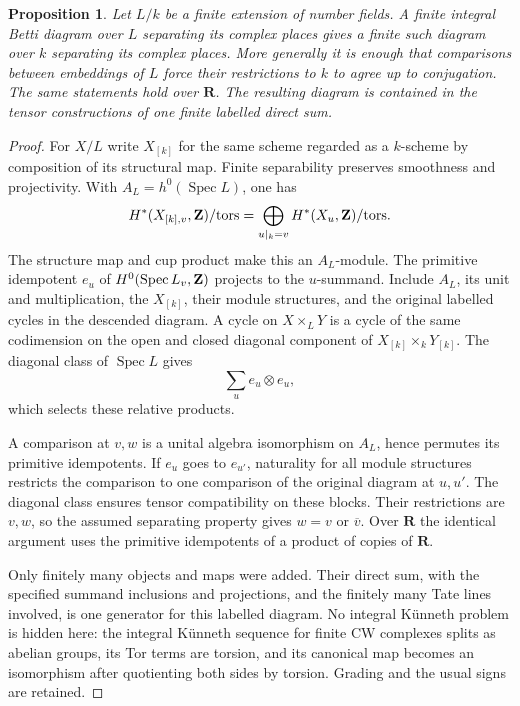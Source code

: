 \documentclass[11pt]{article}
\newtheorem{proposition}[theorem]{Proposition}
\theoremstyle{definition}\newtheorem{definition}[theorem]{Definition}
\theoremstyle{remark}\newtheorem{remark}[theorem]{Remark}
\newcommand{\R}{\mathbf R}\newcommand{\C}{\mathbf C}
\begin{document}
\begin{proposition}\label{prop:finite-test-descent}
Let $L/k$ be a finite extension of number fields. A finite integral Betti
diagram over $L$ separating its complex places gives a finite such diagram
over $k$ separating its complex places. More generally it is enough that
comparisons between embeddings of $L$ force their restrictions to $k$ to
agree up to conjugation. The same statements hold over $\R$.
The resulting diagram is contained in the tensor constructions of one
finite labelled direct sum.
\end{proposition}
\begin{proof}
For $X/L$ write $X_{[k]}$ for the same scheme regarded as a $k$-scheme by
composition of its structural map. Finite separability preserves smoothness
and projectivity. With $A_L=h^0(\operatorname{Spec}L)$, one has
\[
 H^*(X_{[k],v},\mathbf Z)/\mathrm{tors}
   =\bigoplus_{u|_k=v}H^*(X_u,\mathbf Z)/\mathrm{tors}.
\]
The structure map and cup product make this an $A_L$-module. The primitive
idempotent $e_u$ of $H^0(\operatorname{Spec}L_v,\mathbf Z)$ projects to the
$u$-summand. Include $A_L$, its unit and multiplication, the $X_{[k]}$,
their module structures, and the original labelled cycles in the descended
diagram. A cycle on $X\times_LY$ is a cycle of the same codimension on the
open and closed diagonal component of $X_{[k]}\times_kY_{[k]}$.
The diagonal class of $\operatorname{Spec}L$ gives
\[
                         \sum_u e_u\otimes e_u,
\]
which selects these relative products.

A comparison at $v,w$ is a unital algebra isomorphism on $A_L$, hence
permutes its primitive idempotents. If $e_u$ goes to $e_{u'}$, naturality
for all module structures restricts the comparison to one comparison of
the original diagram at $u,u'$. The diagonal class ensures tensor
compatibility on these blocks. Their restrictions are $v,w$, so the
assumed separating property gives $w=v$ or $\overline v$.
Over $\R$ the identical argument uses the primitive idempotents of a
product of copies of $\R$.

Only finitely many objects and maps were added. Their direct sum, with
the specified summand inclusions and projections, and the finitely many
Tate lines involved, is one generator for this labelled diagram. No
integral K\"unneth problem is hidden here: the integral K\"unneth sequence
for finite CW complexes splits as abelian groups, its Tor terms are
torsion, and its canonical map becomes an isomorphism after quotienting
both sides by torsion. Grading and the usual signs are retained.
\end{proof}
\end{document}
